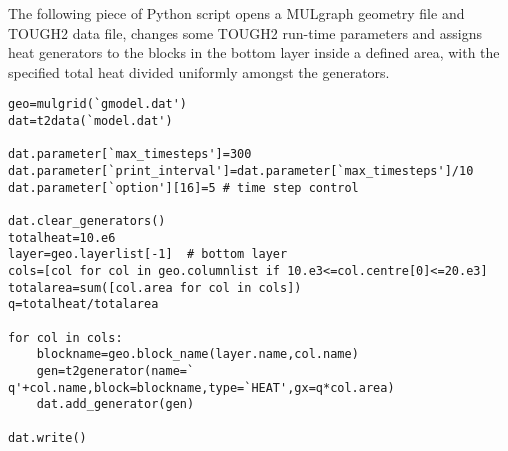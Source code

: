 The following piece of Python script opens a MULgraph geometry file and TOUGH2 data file, changes some TOUGH2 run-time parameters and assigns heat generators to the blocks in the bottom layer inside a defined area, with the specified total heat divided uniformly amongst the generators.

\begin{verbatim}
geo=mulgrid(`gmodel.dat')
dat=t2data(`model.dat')

dat.parameter[`max_timesteps']=300
dat.parameter[`print_interval']=dat.parameter[`max_timesteps']/10
dat.parameter[`option'][16]=5 # time step control

dat.clear_generators()
totalheat=10.e6
layer=geo.layerlist[-1]  # bottom layer
cols=[col for col in geo.columnlist if 10.e3<=col.centre[0]<=20.e3]
totalarea=sum([col.area for col in cols])
q=totalheat/totalarea

for col in cols:
    blockname=geo.block_name(layer.name,col.name)
    gen=t2generator(name=` q'+col.name,block=blockname,type=`HEAT',gx=q*col.area)
    dat.add_generator(gen)

dat.write()

\end{verbatim}
